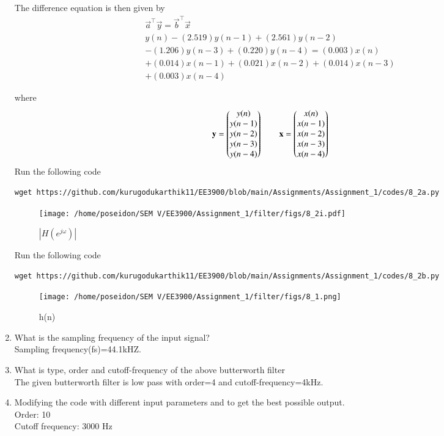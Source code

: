 \documentclass[journal,12pt,twocolumn]{IEEEtran}
\renewcommand\thesection{\arabic{section}}
\begin{document}
\begin{enumerate}[label=\thesection.\arabic*]
	The difference equation is then given by
	\begin{multline}
		\vec{a}^\top \vec{y} = \vec{b}^\top \vec{x} \\
		y(n)-(2.519)y(n-1)+(2.561)y(n-2)\\-(1.206)y(n-3)+(0.220)y(n-4)=
		(0.003)x(n)\\+(0.014)x(n-1)+(0.021)x(n-2)+(0.014)x(n-3)\\+(0.003)x(n-4)
	\end{multline}
	
	where
	\begin{align}
		\mathbf{y} = \begin{pmatrix}y(n) \\ y(n-1) \\ y(n-2) \\ y(n-3) \\ y(n-4)\end{pmatrix} \qquad
		\mathbf{x} = \begin{pmatrix}x(n) \\ x(n-1) \\ x(n-2) \\ x(n-3) \\ x(n-4)\end{pmatrix}
	\end{align}
Run the following code 
\begin{lstlisting}
wget https://github.com/kurugodukarthik11/EE3900/blob/main/Assignments/Assignment_1/codes/8_2a.py
\end{lstlisting}
\begin{figure}[!ht]
\centering
\texttt{[image: /home/poseidon/SEM V/EE3900/Assignment\_1/filter/figs/8\_2i.pdf]}
\caption{$|H(e^{j\omega})|$}
\end{figure}
Run the following code 
\begin{lstlisting}
wget https://github.com/kurugodukarthik11/EE3900/blob/main/Assignments/Assignment_1/codes/8_2b.py
\end{lstlisting}
\begin{figure}[!ht]
\centering
\texttt{[image: /home/poseidon/SEM V/EE3900/Assignment\_1/filter/figs/8\_1.png]}
\caption{h(n)}
\end{figure}
\item What is the sampling frequency of the input signal?
\\
\solution
Sampling frequency(fs)=44.1kHZ.
\item
What is type, order and  cutoff-frequency of the above butterworth filter
\\
\solution
The given butterworth filter is low pass with order=4 and cutoff-frequency=4kHz.
%
\item
Modifying the code with different input parameters and to get the best possible output.\\
%
\solution 
Order: 10\\
Cutoff frequency: 3000 Hz
\end{enumerate}
\end{document}

